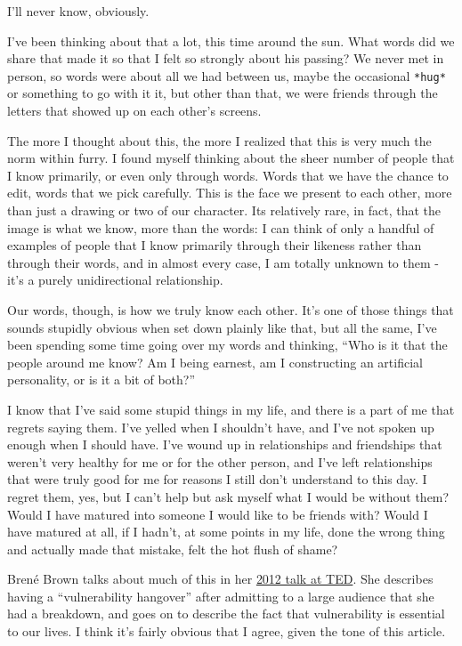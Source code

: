 I'll never know, obviously.

I've been thinking about that a lot, this time around the sun. What
words did we share that made it so that I felt so strongly about his
passing? We never met in person, so words were about all we had between
us, maybe the occasional \texttt{*hug*} or something to go with it it,
but other than that, we were friends through the letters that showed up
on each other's screens.

The more I thought about this, the more I realized that this is very
much the norm within furry. I found myself thinking about the sheer
number of people that I know primarily, or even only through words.
Words that we have the chance to edit, words that we pick carefully.
This is the face we present to each other, more than just a drawing or
two of our character. Its relatively rare, in fact, that the image is
what we know, more than the words: I can think of only a handful of
examples of people that I know primarily through their likeness rather
than through their words, and in almost every case, I am totally unknown
to them - it's a purely unidirectional relationship.

Our words, though, is how we truly know each other. It's one of those
things that sounds stupidly obvious when set down plainly like that, but
all the same, I've been spending some time going over my words and
thinking, ``Who is it that the people around me know? Am I being
earnest, am I constructing an artificial personality, or is it a bit of
both?''

I know that I've said some stupid things in my life, and there is a part
of me that regrets saying them. I've yelled when I shouldn't have, and
I've not spoken up enough when I should have. I've wound up in
relationships and friendships that weren't very healthy for me or for
the other person, and I've left relationships that were truly good for
me for reasons I still don't understand to this day. I regret them, yes,
but I can't help but ask myself what I would be without them? Would I
have matured into someone I would like to be friends with? Would I have
matured at all, if I hadn't, at some points in my life, done the wrong
thing and actually made that mistake, felt the hot flush of shame?

Brené Brown talks about much of this in her
\href{http://www.ted.com/talks/brene_brown_listening_to_shame?language=en}{2012
talk at TED}. She describes having a ``vulnerability hangover'' after
admitting to a large audience that she had a breakdown, and goes on to
describe the fact that vulnerability is essential to our lives. I think
it's fairly obvious that I agree, given the tone of this article.

